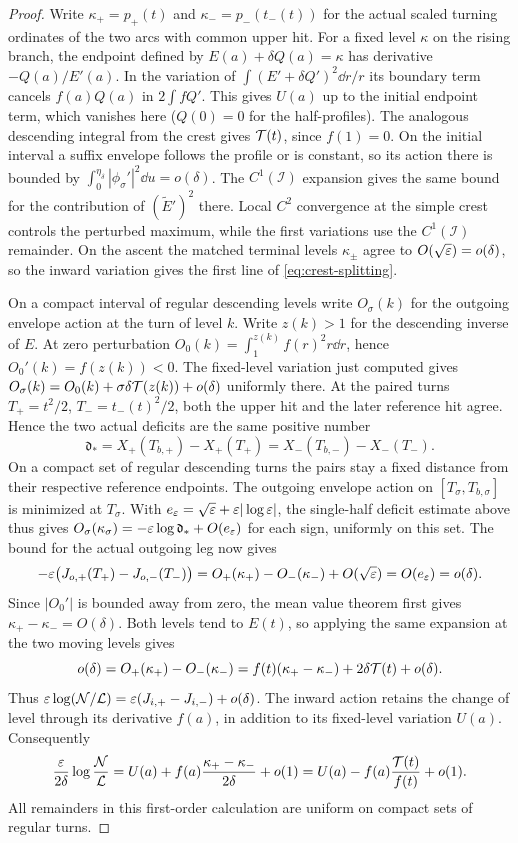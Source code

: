 \begin{proof}
Write $\kappa_+=p_+(t)$ and $\kappa_-=p_-(t_-(t))$ for the
actual scaled turning ordinates of the two arcs with common upper hit.
For a fixed level $\kappa$ on the rising branch, the endpoint defined
by $E(a)+\delta Q(a)=\kappa$ has derivative $-Q(a)/E'(a)$. In the variation of
$\int (E'+\delta Q')^2\dd r/r$ its boundary term cancels $f(a)Q(a)$
in $2\int fQ'$. This gives $U(a)$ up to the initial endpoint term,
which vanishes here ($Q(0)=0$ for the half-profiles).
The analogous descending integral from the crest gives $\mathcal{T}(t)$, since
$f(1)=0$. On the initial interval a suffix envelope follows the profile or is
constant, so its action there is bounded by
$\int_0^{\eta_\delta}|\phi_\sigma'|^2\dd u=o(\delta)$.
The $C^1(\mathcal I)$ expansion gives the same bound for the contribution of
$(\widetilde E')^2$ there. Local $C^2$ convergence at the simple crest
controls the perturbed maximum, while the first variations use the
$C^1(\mathcal I)$ remainder.
On the ascent the matched terminal levels $\kappa_\pm$ agree to
$O(\sqrt{\varepsilon})=o(\delta)$, so the inward variation gives the first
line of \eqref{eq:crest-splitting}.

On a compact interval of regular descending levels write
$O_\sigma(k)$ for the outgoing envelope action at the turn of level $k$.
Write $z(k)>1$ for the descending inverse of $E$. At zero perturbation
$O_0(k)=\int_1^{z(k)} f(r)^2r\dd r$, hence $O_0'(k)=f(z(k))<0$.
The fixed-level variation just computed gives
$O_\sigma(k)=O_0(k)+\sigma\delta\mathcal{T}(z(k))+o(\delta)$ uniformly there.
At the paired turns $T_+=t^2/2$, $T_-=t_-(t)^2/2$, both the upper
hit and the later reference hit agree. Hence the two actual deficits
are the same positive number
\[
 \mathfrak d_*=X_+(T_{b,+})-X_+(T_+)=X_-(T_{b,-})-X_-(T_-).
\]
On a compact set of regular descending turns the pairs stay a fixed
distance from their respective reference endpoints. The outgoing
envelope action on $[T_\sigma,T_{b,\sigma}]$ is minimized at
$T_\sigma$. With $e_\varepsilon=\sqrt{\varepsilon}+\varepsilon|\log\varepsilon|$, the single-half
deficit estimate above thus gives
$O_\sigma(\kappa_\sigma)=-\varepsilon\log\mathfrak d_*+O(e_\varepsilon)$ for each sign,
uniformly on this set. The bound for the actual outgoing leg now gives
\[
 -\varepsilon\bigl(J_{o,+}(T_+)-J_{o,-}(T_-)\bigr)
 = O_+(\kappa_+)-O_-(\kappa_-)+O(\sqrt{\varepsilon})
 = O(e_\varepsilon)=o(\delta).
\]
Since $|O_0'|$ is bounded away from zero, the mean value theorem first
gives $\kappa_+-\kappa_-=O(\delta)$. Both levels tend to $E(t)$, so
applying the same expansion at the two moving levels gives
\[
 o(\delta)=O_+(\kappa_+)-O_-(\kappa_-)
 =f(t)(\kappa_+-\kappa_-)+2\delta\mathcal{T}(t)+o(\delta).
\]
Thus $\varepsilon\log(\mathcal N/\mathcal L)=\varepsilon(J_{i,+}-J_{i,-})+o(\delta)$.
The inward action retains the change of level through its derivative
$f(a)$, in addition to its fixed-level variation $U(a)$. Consequently
\[
 \frac{\varepsilon}{2\delta}\log\frac{\mathcal N}{\mathcal L}
 =U(a)+f(a)\frac{\kappa_+-\kappa_-}{2\delta}+o(1)
 =U(a)-f(a)\frac{\mathcal{T}(t)}{f(t)}+o(1).
\]
All remainders in this first-order calculation are uniform on compact
sets of regular turns.


\end{proof}
